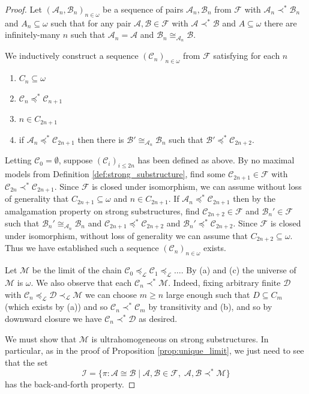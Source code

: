 \documentclass[12pt]{amsart}
\theoremstyle{plain}
\theoremstyle{definition}
\newcommand{\isom}{\cong}
\newcommand{\mcA}{\mathcal{A}}
\newcommand{\mcB}{\mathcal{B}}
\newcommand{\mcC}{\mathcal{C}}
\newcommand{\mcD}{\mathcal{D}}
\newcommand{\mcF}{\mathcal{F}}
\newcommand{\mcI}{\mathcal{I}}
\newcommand{\mcL}{\mathcal{L}}
\newcommand{\mcM}{\mathcal{M}}
\begin{document}
\begin{proof}
Let $(\mcA_n, \mcB_n)_{n \in \omega}$ be a sequence of pairs $\mcA_n, \mcB_n$ from $\mcF$ with $\mcA_n \prec^* \mcB_n$ and $A_n \subseteq \omega$ such that for any pair $\mcA, \mcB \in \mcF$ with $\mcA \prec^* \mcB$ and $A \subseteq \omega$ there are infinitely-many $n$ such that $\mcA_n = \mcA$ and $\mcB_n \isom_{\mcA_n} \mcB$.

We inductively construct a sequence $(\mcC_n)_{n \in \omega}$ from $\mcF$ satisfying for each $n$
\begin{enumerate}
\item[(a)] $C_n \subseteq \omega$
\item[(b)] $\mcC_n \preceq^* \mcC_{n+1}$
\item[(c)] $n \in C_{2n+1}$
\item[(d)] if $\mcA_n \preceq^* \mcC_{2n+1}$ then there is $\mcB' \isom_{\mcA_n} \mcB_n$ such that $\mcB' \preceq^* \mcC_{2n+2}$.
\end{enumerate}
Letting $\mcC_0 = \emptyset$, suppose $(\mcC_i)_{i \le 2n}$ has been defined as above.
By no maximal models from Definition \ref{def:strong_substructure}, find some $\mcC_{2n+1} \in \mcF$ with $\mcC_{2n} \prec^* \mcC_{2n+1}$. Since $\mcF$ is closed under isomorphism, we can assume without loss of generality that $C_{2n+1} \subseteq \omega$ and $n \in C_{2n+1}$.
If $\mcA_n \preceq^* \mcC_{2n+1}$ then by the amalgamation property on strong substructures, find $\mcC_{2n+2} \in \mcF$ and $\mcB_n' \in \mcF$ such that $\mcB_n' \isom_{\mcA_n} \mcB_n$ and $\mcC_{2n+1} \preceq^* \mcC_{2n+2}$ and $\mcB_n' \preceq^* \mcC_{2n+2}$.
Since $\mcF$ is closed under isomorphism, without loss of generality we can assume that $C_{2n+2} \subseteq \omega$.
Thus we have established such a sequence $(\mcC_n)_{n \in \omega}$ exists.

Let $\mcM$ be the limit of the chain $\mcC_0 \preceq_\mcL \mcC_1 \preceq_\mcL \dots$.
By (a) and (c) the universe of $\mcM$ is $\omega$.
We also observe that each $\mcC_n \prec^* \mcM$.
Indeed, fixing arbitrary finite $\mcD$ with $\mcC_n \preceq_\mcL \mcD \prec_\mcL \mcM$ we can choose $m \ge n$ large enough such that $D \subseteq C_m$ (which exists by (a)) and so $\mcC_n \prec^* \mcC_m$ by transitivity and (b), and so by downward closure we have $\mcC_n \prec^* \mcD$ as desired.

We must show that $\mcM$ is ultrahomogeneous on strong substructures.
In particular, as in the proof of Proposition \ref{prop:unique_limit}, we just need to see that the set
\[ \mcI = \{\pi : \mcA \isom \mcB \mid \mcA, \mcB \in \mcF, \; \mcA, \mcB \prec^* \mcM\}\]
has the back-and-forth property.


\end{proof}
\end{document}
